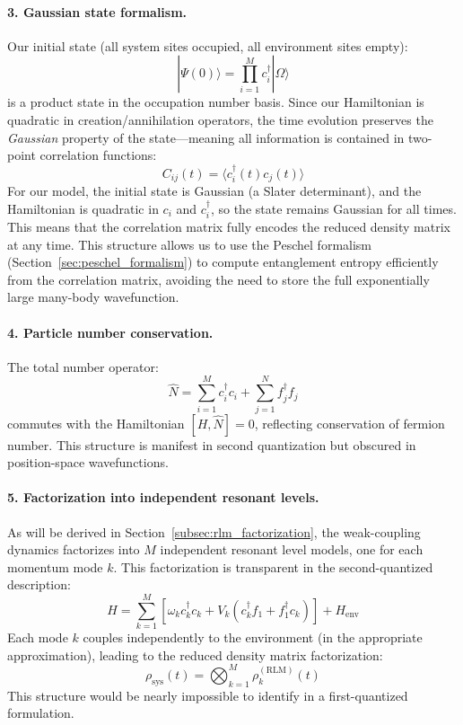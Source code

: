 \documentclass[12pt,oneside,openright]{report}
\theoremstyle{definition}
\theoremstyle{plain}
\theoremstyle{remark}
\begin{document}
\paragraph{3. Gaussian state formalism.}
Our initial state (all system sites occupied, all environment sites empty):
\begin{equation}
|\Psi(0)\rangle = \prod_{i=1}^M c_i^\dagger |\Omega\rangle
\end{equation}
is a product state in the occupation number basis. Since our Hamiltonian is quadratic in 
creation/annihilation operators, the time evolution preserves the \emph{Gaussian} property 
of the state—meaning all information is contained in two-point correlation functions:
\begin{equation}
C_{ij}(t) = \langle c_i^\dagger(t) c_j(t) \rangle
\end{equation}
For our model, the initial state is Gaussian (a Slater determinant), and the Hamiltonian is quadratic in $c_i$ and $c_i^\dagger$, so the state remains Gaussian for all times. This means that the correlation matrix fully encodes the reduced density matrix at any time.
This structure allows us to use the Peschel formalism (Section~\ref{sec:peschel_formalism}) to compute 
entanglement entropy efficiently from the correlation matrix, avoiding the need to store 
the full exponentially large many-body wavefunction.

\paragraph{4. Particle number conservation.}
The total number operator:
\begin{equation}
\hat{N} = \sum_{i=1}^M c_i^\dagger c_i + \sum_{j=1}^N f_j^\dagger f_j
\end{equation}
commutes with the Hamiltonian $[H, \hat{N}] = 0$, reflecting conservation of fermion number. 
This structure is manifest in second quantization but obscured in position-space wavefunctions.

\paragraph{5. Factorization into independent resonant levels.}
As will be derived in Section~\ref{subsec:rlm_factorization}, the weak-coupling dynamics factorizes 
into $M$ independent resonant level models, one for each momentum mode $k$. This factorization 
is transparent in the second-quantized description:
\begin{equation}
H = \sum_{k=1}^M \left[\omega_k c_k^\dagger c_k + V_k (c_k^\dagger f_1 + f_1^\dagger c_k)\right] + H_{\mathrm{env}}
\end{equation}
Each mode $k$ couples independently to the environment (in the appropriate approximation), 
leading to the reduced density matrix factorization:
\begin{equation}
\rho_{\mathrm{sys}}(t) = \bigotimes_{k=1}^M \rho_k^{(\mathrm{RLM})}(t)
\end{equation}
This structure would be nearly impossible to identify in a first-quantized formulation.
\end{document}
